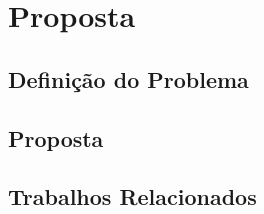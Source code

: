 \chapter{Proposta}

\section{Definição do Problema}

\section{Proposta}

\section{Trabalhos Relacionados}
